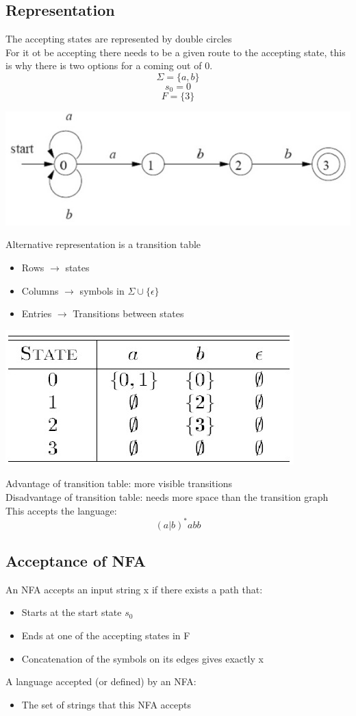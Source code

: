 \documentclass{article}[18pt]
\begin{document}
\subsection{Representation}
The accepting states are represented by double circles\\
For it ot be accepting there needs to be a given route to the accepting state, this is why there is two options for a coming out of 0.
$$\Sigma = \{a,b\}$$
$$s_0=0$$
$$F=\{3\}$$
\begin{center}
	\includegraphics[scale=0.7]{NFA}
\end{center}
Alternative representation is a transition table
\begin{itemize}
	\item Rows $\rightarrow$ states
	\item Columns $\rightarrow$ symbols in $\Sigma \cup \{\epsilon\}$
	\item Entries $\rightarrow$ Transitions between states
\end{itemize}
\begin{center}
	\includegraphics[scale=0.7]{NFA1}
\end{center}
Advantage of transition table: more visible transitions\\
Disadvantage of transition table: needs more space than the transition graph\\
This accepts the language:
$$(a|b)^*abb$$
\subsection{Acceptance of NFA}
An NFA accepts an input string x if there exists a path that:
\begin{itemize}
	\item Starts at the start state $s_0$
	\item Ends at one of the accepting states in F
	\item Concatenation of the symbols on its edges gives exactly x
\end{itemize}
A language accepted (or defined) by an NFA:
\begin{itemize}
	\item The set of strings that this NFA accepts
\end{itemize}
\end{document}
